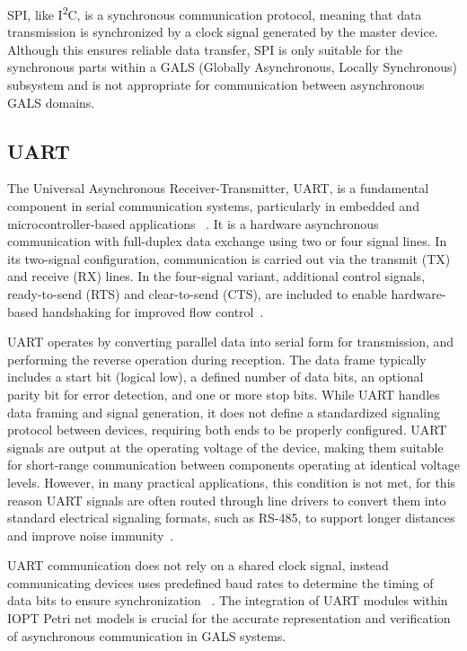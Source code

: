 SPI, like I\textsuperscript{2}C, is a synchronous communication protocol, meaning that data transmission is synchronized by a clock signal generated by the master device. Although this ensures reliable data transfer, SPI is only suitable for the synchronous parts within a GALS (Globally Asynchronous, Locally Synchronous) subsystem and is not appropriate for communication between asynchronous GALS domains.

\subsection{UART}
\label{sub:uart}

The Universal Asynchronous Receiver-Transmitter, UART, is a fundamental component in serial communication systems, particularly in embedded and microcontroller-based applications ~\cite{UARTwiki}. It is a hardware asynchronous communication with full-duplex data exchange using two or four signal lines. In its two-signal configuration, communication is carried out via the transmit (TX) and receive (RX) lines. In the four-signal variant, additional control signals, ready-to-send (RTS) and clear-to-send (CTS), are included to enable hardware-based handshaking for improved flow control~\cite{Rao2021}.

UART operates by converting parallel data into serial form for transmission, and performing the reverse operation during reception. The data frame typically includes a start bit (logical low), a defined number of data bits, an optional parity bit for error detection, and one or more stop bits. While UART handles data framing and signal generation, it does not define a standardized signaling protocol between devices, requiring both ends to be properly configured. UART signals are output at the operating voltage of the device, making them suitable for short-range communication between components operating at identical voltage levels. However, in many practical applications, this condition is not met, for this reason  UART signals are often routed through line drivers to convert them into standard electrical signaling formats, such as RS-485, to support longer distances and improve noise immunity~\cite{Rao2021}.

UART communication does not rely on a shared clock signal, instead communicating devices uses predefined baud rates to determine the timing of data bits to ensure synchronization ~\cite{UARTard}.  The integration of UART modules within IOPT Petri net models is crucial for the accurate representation and verification of asynchronous communication in GALS systems. 




